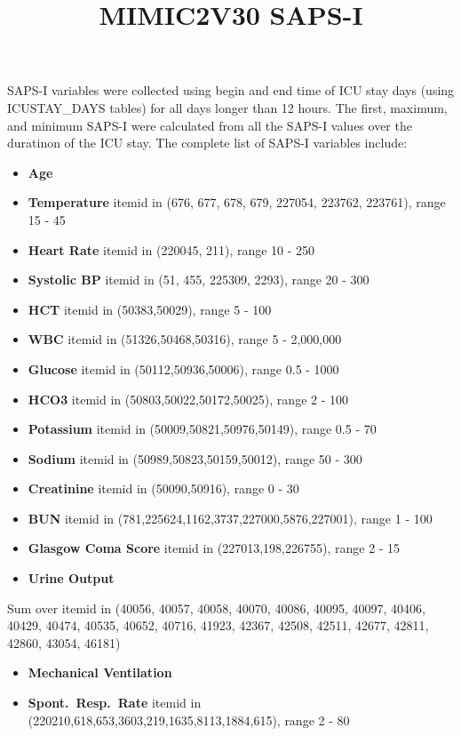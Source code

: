 \documentclass[10pt]{article}
\begin{document}
\title{MIMIC2V30 SAPS-I}
\maketitle

\noindent SAPS-I variables were collected using begin and end 
time of ICU stay days (using ICUSTAY\_DAYS tables) 
for all days longer than 12 hours. The first, maximum, and minimum SAPS-I 
were calculated from all the SAPS-I values over the duratinon of the ICU 
stay. The complete list of SAPS-I variables include:
\begin{itemize}
\item {\bf Age} 
\item {\bf Temperature} itemid in (676, 677, 678, 679, 227054, 223762, 223761), range 15 - 45 
\item {\bf Heart Rate} itemid in (220045, 211), range 10 - 250
\item {\bf Systolic BP} itemid in (51, 455, 225309, 2293), range 20 - 300
\item {\bf HCT} itemid in (50383,50029), range 5 - 100
\item {\bf WBC} itemid in (51326,50468,50316), range  5 - 2,000,000
\item {\bf Glucose} itemid in (50112,50936,50006), range 0.5 - 1000
\item {\bf HCO3} itemid in (50803,50022,50172,50025), range  2 - 100
\item {\bf Potassium} itemid in (50009,50821,50976,50149), range 0.5 - 70
\item {\bf Sodium} itemid in (50989,50823,50159,50012), range 50 - 300
\item {\bf Creatinine} itemid in (50090,50916), range 0 - 30
\item {\bf BUN} itemid in (781,225624,1162,3737,227000,5876,227001), range 1 - 100
\item {\bf Glasgow Coma Score} itemid in (227013,198,226755), range 2 - 15
\item {\bf Urine Output} 
\end{itemize}
Sum over itemid in (40056, 40057, 40058, 40070, 40086, 40095, 40097, 40406,
      40429, 40474, 40535, 40652, 40716, 41923, 42367, 42508, 42511, 42677,
      42811, 42860, 43054, 46181)
\begin{itemize}
\item {\bf Mechanical Ventilation} 
\item {\bf Spont.~Resp.~Rate} itemid in (220210,618,653,3603,219,1635,8113,1884,615), range 2 - 80
\end{itemize}
\end{document}
